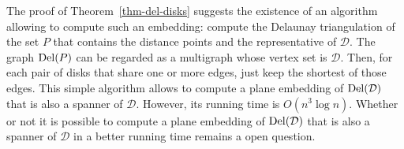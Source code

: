 \documentclass[pdftex,leqno,fleqn,12pt]{article}
\newcommand{\DEL}{{\rm{Del}}}
\newtheorem{definition}[theorem]{Definition}
\newcommand{\old}[1]{{}}
\begin{document}
The proof of Theorem~\ref{thm-del-disks} suggests the existence of an algorithm allowing to compute
such an embedding: compute the Delaunay triangulation of the set $P$ that contains the distance
points and the representative of $\mathcal{D}$. The graph $\DEL(P)$ can be regarded as a multigraph
whose vertex set is $\mathcal{D}$. Then, for each pair of disks that share one or more edges, just
keep the shortest of those edges. This simple algorithm allows to compute a plane embedding of
$\DEL(\mathcal{D})$ that is also a spanner of $\mathcal{D}$. However, its running time is
$O(n^3\log n)$. Whether or not it is possible to compute a plane embedding of $\DEL(\mathcal{D})$
that is also a spanner of $\mathcal{D}$ in a better running time remains a open question.



\old{

In this section, we show that $\DEL(\mathcal{D})$ has a plane embedding that has the same spanning
ratio as the Delaunay graph of a set of points and that given $\DEL(\mathcal{D})$ (which can be
computed in time $O(n\log n)$), this embedding can be computed in time $O(n)$.

\begin{definition} Let $\mathcal{D}$ be a finite set of disjoint disks, and $A,B\in \mathcal{D}$
such that the edge $(A,B)$ is in $\DEL(\mathcal{D})$. The points $p_1,p_2$ are \emph{witnesses} of
the edge $(A,B)$ if there is a disk $F$ such that
\begin{enumerate}
\item $p_1\in(A\cap F)$ and $p_2\in(B\cap F)$ and
\item $F$ does not intersect any other disk of $\mathcal{D}$.
\end{enumerate}
They are also \emph{minimum witnesses} if the distance between them is minimum. Notice that in that
case, the disk $F$ has minimum radius and is tangent to $A$ and $B$. A set of points $W$ is a
\emph{(minimum) witness} of $\DEL(\mathcal{P})$ if it contains (minimum) witnesses for all edges in
$\DEL(\mathcal{D})$.
\end{definition}

}
\end{document}
